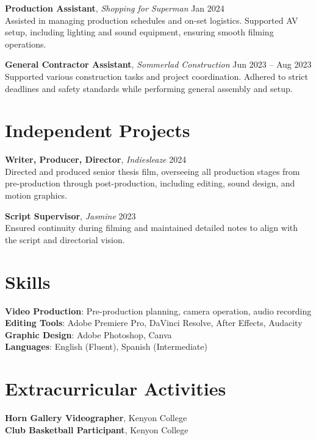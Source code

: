 \documentclass[letterpaper,11pt]{article}
\begin{document}
\textbf{Production Assistant}, \textit{Shopping for Superman} \hfill Jan 2024\\
Assisted in managing production schedules and on-set logistics. Supported AV setup, including lighting and sound equipment, ensuring smooth filming operations.

\textbf{General Contractor Assistant}, \textit{Sommerlad Construction} \hfill Jun 2023 -- Aug 2023\\
Supported various construction tasks and project coordination. Adhered to strict deadlines and safety standards while performing general assembly and setup.

\section*{Independent Projects}
\textbf{Writer, Producer, Director}, \textit{Indiesleaze} \hfill 2024\\
Directed and produced senior thesis film, overseeing all production stages from pre-production through post-production, including editing, sound design, and motion graphics.

\textbf{Script Supervisor}, \textit{Jasmine} \hfill 2023\\
Ensured continuity during filming and maintained detailed notes to align with the script and directorial vision.

\section*{Skills}
\textbf{Video Production}: Pre-production planning, camera operation, audio recording\\
\textbf{Editing Tools}: Adobe Premiere Pro, DaVinci Resolve, After Effects, Audacity\\
\textbf{Graphic Design}: Adobe Photoshop, Canva\\
\textbf{Languages}: English (Fluent), Spanish (Intermediate)

\section*{Extracurricular Activities}
\textbf{Horn Gallery Videographer}, Kenyon College\\
\textbf{Club Basketball Participant}, Kenyon College
\end{document}
